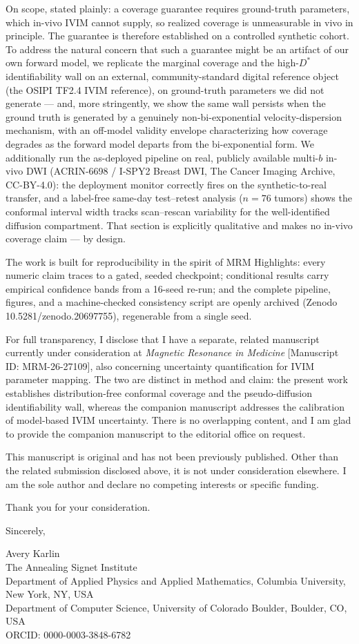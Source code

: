 \documentclass[11pt]{article}
\newcommand{\Dstar}{D^{*}}
\begin{document}
On scope, stated plainly: a coverage guarantee requires ground-truth parameters,
which in-vivo IVIM cannot supply, so realized coverage is unmeasurable in vivo in
principle. The guarantee is therefore established on a controlled synthetic cohort.
To address the natural concern that such a guarantee might be an artifact of our own
forward model, we replicate the marginal coverage and the high-$\Dstar$
identifiability wall on an external, community-standard digital reference object
(the OSIPI TF2.4 IVIM reference), on ground-truth parameters we did not generate ---
and, more stringently, we show the same wall persists when the ground truth is
generated by a genuinely non-bi-exponential velocity-dispersion mechanism, with an
off-model validity envelope characterizing how coverage degrades as the forward
model departs from the bi-exponential form. We additionally run the as-deployed
pipeline on real, publicly available multi-$b$ in-vivo DWI (ACRIN-6698 / I-SPY2
Breast DWI, The Cancer Imaging Archive, CC-BY-4.0): the deployment monitor correctly
fires on the synthetic-to-real transfer, and a label-free same-day test--retest
analysis ($n = 76$ tumors) shows the conformal interval width tracks scan--rescan
variability for the well-identified diffusion compartment. That section is
explicitly qualitative and makes no in-vivo coverage claim --- by design.

The work is built for reproducibility in the spirit of MRM Highlights: every numeric
claim traces to a gated, seeded checkpoint; conditional results carry empirical
confidence bands from a 16-seed re-run; and the complete pipeline, figures, and a
machine-checked consistency script are openly archived (Zenodo
10.5281/zenodo.20697755), regenerable from a single seed.

For full transparency, I disclose that I have a separate, related manuscript
currently under consideration at \emph{Magnetic Resonance in Medicine} [Manuscript
ID: MRM-26-27109], also concerning uncertainty quantification for IVIM parameter
mapping. The two are distinct in method and claim: the present work establishes
distribution-free conformal coverage and the pseudo-diffusion identifiability wall,
whereas the companion manuscript addresses the calibration of model-based IVIM
uncertainty. There is no overlapping content, and I am glad to provide the companion
manuscript to the editorial office on request.

This manuscript is original and has not been previously published. Other than the
related submission disclosed above, it is not under consideration elsewhere. I am
the sole author and declare no competing interests or specific funding.

Thank you for your consideration.

\medskip
\noindent Sincerely,

\medskip
\noindent Avery Karlin \\
The Annealing Signet Institute \\
Department of Applied Physics and Applied Mathematics, Columbia University, New
York, NY, USA \\
Department of Computer Science, University of Colorado Boulder, Boulder, CO, USA \\
ORCID: 0000-0003-3848-6782
\end{document}
